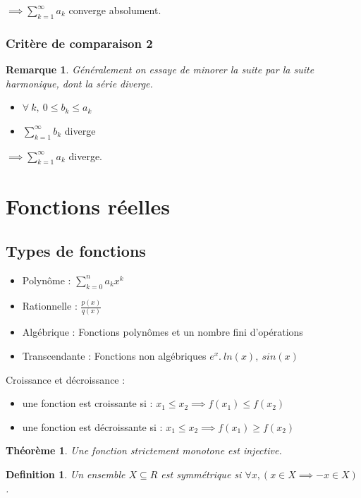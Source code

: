 \documentclass{article}
\newtheorem{definition}{Definition}[section]
\newtheorem{remark}{Remarque}[section]
\newtheorem{theorem}{Théorème}
\begin{document}
$ \implies \sum_{k=1}^{\infty} a_k $ converge absolument.

\subsubsection{Critère de comparaison 2}

\begin{remark}
    Généralement on essaye de minorer la suite par la suite harmonique, dont la série diverge.
\end{remark}

\begin{itemize}
    \item $ \forall\ k,\ 0 \leq b_k \leq a_k $
    \item $ \sum_{k=1}^{\infty} b_k $ diverge
\end{itemize}

$ \implies \sum_{k=1}^{\infty} a_k $ diverge.

\section{Fonctions réelles}
\subsection{Types de fonctions}
\begin{itemize}
    \item Polynôme : $ \sum_{k = 0}^{n}a_kx^k $
    \item Rationnelle : $ \frac{p(x)}{q(x)} $
    \item Algébrique : Fonctions polynômes et un nombre fini d'opérations
    \item Transcendante : Fonctions non algébriques $e^x.\ ln(x),\ sin(x)$
\end{itemize}
Croissance et décroissance :
\begin{itemize}
    \item une fonction est croissante si : $ x_1 \leq x_2 \implies f(x_1) \leq f(x_2) $
    \item une fonction est décroissante si : $ x_1 \leq x_2 \implies f(x_1) \geq f(x_2) $
\end{itemize}
\begin{theorem}
    Une fonction strictement monotone est injective.
\end{theorem}

\begin{definition}
    Un ensemble $ X \subseteq R $ est symmétrique si $ \forall x, (x \in X \implies -x \in X) $.
\end{definition}
\end{document}
